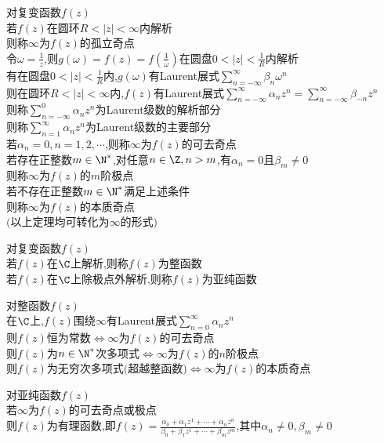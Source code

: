 \begin{dingyi}
对复变函数$f(z)$\\
若$f(z)$在圆环$R<|z|<\infty$内解析\\
则称$\infty$为$f(z)$的孤立奇点\\
令$\omega=\frac{1}{z}$,则$g(\omega)=f(z)=f(\frac{1}{\omega})$在圆盘$0<|z|<\frac{1}{R}$内解析\\
有在圆盘$0<|z|<\frac{1}{R}$内,$g(\omega)$有Laurent展式$\sum\limits_{n=-\infty}^{\infty}\beta_n\omega^n$\\
则在圆环$R<|z|<\infty$内,$f(z)$有Laurent展式$\sum\limits_{n=-\infty}^{\infty}\alpha_nz^n=\sum\limits_{n=-\infty}^{\infty}\beta_{-n}z^n$\\
则称$\sum\limits_{n=-\infty}^{0}\alpha_nz^n$为Laurent级数的解析部分\\
则称$\sum\limits_{n=1}^{\infty}\alpha_nz^n$为Laurent级数的主要部分\\
若$\alpha_n=0,n=1,2,\cdots$,则称$\infty$为$f(z)$的可去奇点\\
若存在正整数$m\in\N^*$,对任意$n\in\Z,n>m$,有$\alpha_n=0$且$\beta_{m}\neq 0$\\
则称$\infty$为$f(z)$的$m$阶极点\\
若不存在正整数$m\in\N^*$满足上述条件\\
则称$\infty$为$f(z)$的本质奇点\\
$($以上定理均可转化为$\infty$的形式$)$
\end{dingyi}

\begin{dingyi}
对复变函数$f(z)$\\
若$f(z)$在$\C$上解析,则称$f(z)$为整函数\\
若$f(z)$在$\C$上除极点外解析,则称$f(z)$为亚纯函数
\end{dingyi}

\begin{dingli}
对整函数$f(z)$\\
在$\C$上,$f(z)$围绕$\infty$有Laurent展式$\sum\limits_{n=0}^{\infty}\alpha_nz^n$\\
则$f(z)$恒为常数$\Leftrightarrow$$\infty$为$f(z)$的可去奇点\\
则$f(z)$为$n\in\N^*$次多项式$\Leftrightarrow$$\infty$为$f(z)$的$n$阶极点\\
则$f(z)$为无穷次多项式$($超越整函数$)$$\Leftrightarrow$$\infty$为$f(z)$的本质奇点
\end{dingli}

\begin{dingli}
对亚纯函数$f(z)$\\
若$\infty$为$f(z)$的可去奇点或极点\\
则$f(z)$为有理函数,即$f(z)=\frac{\alpha_0+\alpha_1 z^1+\cdots+\alpha_n z^n}{\beta_0+\beta_1 z^1+\cdots+\beta_m z^m}$,其中$\alpha_n\neq0,\beta_m\neq0$
\end{dingli}

